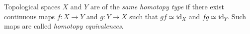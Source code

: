 Topological spaces $X$ and $Y$ are of the \textit{same homotopy type} if there exist continuous maps $f: X \to Y$ and $g: Y \to X$ such that $gf \simeq \mathrm{id}_X$ and $fg \simeq \mathrm{id}_Y$. Such maps are called \textit{homotopy equivalences}.
